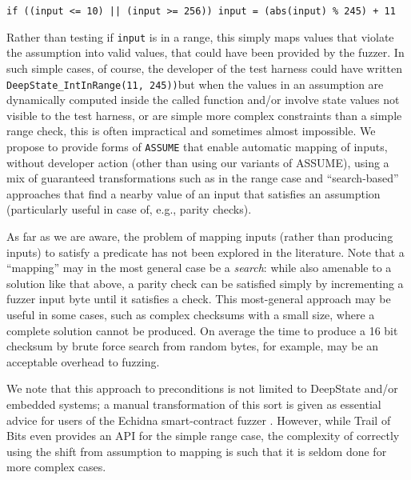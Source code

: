   {\tt if ((input <= 10) || (input >= 256)) input = (abs(input) \% 245) + 11}

  Rather than testing if {\tt input} is in a range, this simply maps values that violate the assumption into valid values, that could have been provided by the fuzzer.  In such simple cases, of course, the developer of the test harness could have written {\tt DeepState\_IntInRange(11, 245))}but when the values in an assumption are dynamically computed inside the called function and/or involve state values not visible to the test harness, or are simple more complex constraints than a simple range check, this is often impractical and sometimes almost impossible.  We propose to provide forms of {\tt ASSUME} that enable automatic mapping of inputs, without developer action (other than using our variants of ASSUME), using a mix of guaranteed transformations such as in the range case and ``search-based'' approaches that find a nearby value of an input that satisfies an assumption (particularly useful in case of, e.g., parity checks).

As far as we are aware, the problem of mapping inputs (rather than producing inputs) to satisfy a predicate has not been explored in the literature.  Note that a ``mapping'' may in the most general case be a \emph{search}: while also amenable to a solution like that above, a parity check can be satisfied simply by incrementing a fuzzer input byte until it satisfies a check.  This most-general approach may be useful in some cases, such as complex checksums with a small size, where a complete solution cannot be produced.  On average the time to produce a 16 bit checksum by brute force search from random bytes, for example, may be an acceptable overhead to fuzzing.

 We note that this approach to preconditions is not limited to DeepState and/or embedded systems; a manual transformation of this sort is given as essential advice for users of the Echidna smart-contract fuzzer \cite{echidna-advice}.  However, while Trail of Bits even provides an API for the simple range case, the complexity of correctly using the shift from assumption to mapping is such that it is seldom done for more complex cases.
  

